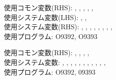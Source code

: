 \clearpage

\begin{hosoku}\small
使用コモン変数(RHS): , , , , , \\
使用システム変数(LHS): , , \\
使用システム変数(RHS): , , , , , , , , \\
使用プログラム: O9392, O9393
\end{hosoku}


\clearpage

\begin{hosoku}\small
使用コモン変数(RHS): , , , , \\
使用システム変数: , , , , , , , , , , , \\
使用プログラム: O9392, 09393
\end{hosoku}



